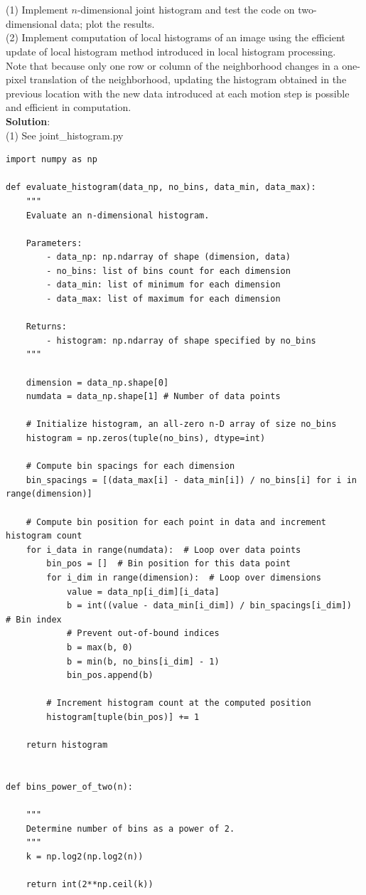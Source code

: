 \documentclass[UTF8]{ctexart}
\begin{document}
\section{}
(1) Implement $n$-dimensional joint histogram and test the code on two-dimensional data; plot the results.\\
(2) Implement computation of local histograms of an image using the efficient update of local histogram method introduced in local histogram processing.\\
Note that because only one row or column of the neighborhood changes in a one-pixel translation of the neighborhood, updating the histogram obtained in the previous location with the new data introduced at each motion step is possible and efficient in computation.\\
\textbf{Solution}:\\
(1) See joint\_histogram.py
\begin{lstlisting}
import numpy as np

def evaluate_histogram(data_np, no_bins, data_min, data_max):
    """
    Evaluate an n-dimensional histogram.
    
    Parameters:
        - data_np: np.ndarray of shape (dimension, data)
        - no_bins: list of bins count for each dimension
        - data_min: list of minimum for each dimension
        - data_max: list of maximum for each dimension

    Returns:
        - histogram: np.ndarray of shape specified by no_bins
    """

    dimension = data_np.shape[0]
    numdata = data_np.shape[1] # Number of data points
    
    # Initialize histogram, an all-zero n-D array of size no_bins
    histogram = np.zeros(tuple(no_bins), dtype=int)
    
    # Compute bin spacings for each dimension
    bin_spacings = [(data_max[i] - data_min[i]) / no_bins[i] for i in range(dimension)]
    
    # Compute bin position for each point in data and increment histogram count
    for i_data in range(numdata):  # Loop over data points
        bin_pos = []  # Bin position for this data point
        for i_dim in range(dimension):  # Loop over dimensions
            value = data_np[i_dim][i_data]
            b = int((value - data_min[i_dim]) / bin_spacings[i_dim])  # Bin index
            # Prevent out-of-bound indices
            b = max(b, 0)
            b = min(b, no_bins[i_dim] - 1)
            bin_pos.append(b)
        
        # Increment histogram count at the computed position
        histogram[tuple(bin_pos)] += 1
    
    return histogram


def bins_power_of_two(n):
    
    """
    Determine number of bins as a power of 2.
    """
    k = np.log2(np.log2(n))
    
    return int(2**np.ceil(k))
\end{lstlisting}
\end{document}
